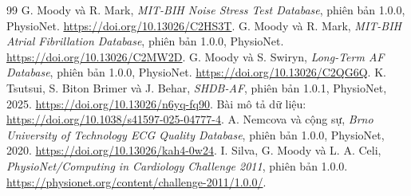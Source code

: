 \documentclass[12pt,a4paper,oneside]{report}
\begin{document}
\begin{thebibliography}{99}
 G. Moody và R. Mark, \emph{MIT-BIH Noise Stress Test Database}, phiên bản 1.0.0, PhysioNet. \url{https://doi.org/10.13026/C2HS3T}.
 G. Moody và R. Mark, \emph{MIT-BIH Atrial Fibrillation Database}, phiên bản 1.0.0, PhysioNet. \url{https://doi.org/10.13026/C2MW2D}.
 G. Moody và S. Swiryn, \emph{Long-Term AF Database}, phiên bản 1.0.0, PhysioNet. \url{https://doi.org/10.13026/C2QG6Q}.
 K. Tsutsui, S. Biton Brimer và J. Behar, \emph{SHDB-AF}, phiên bản 1.0.1, PhysioNet, 2025. \url{https://doi.org/10.13026/n6yq-fq90}. Bài mô tả dữ liệu: \url{https://doi.org/10.1038/s41597-025-04777-4}.
 A. Nemcova và cộng sự, \emph{Brno University of Technology ECG Quality Database}, phiên bản 1.0.0, PhysioNet, 2020. \url{https://doi.org/10.13026/kah4-0w24}.
 I. Silva, G. Moody và L. A. Celi, \emph{PhysioNet/Computing in Cardiology Challenge 2011}, phiên bản 1.0.0. \url{https://physionet.org/content/challenge-2011/1.0.0/}.
\end{thebibliography}
\end{document}
